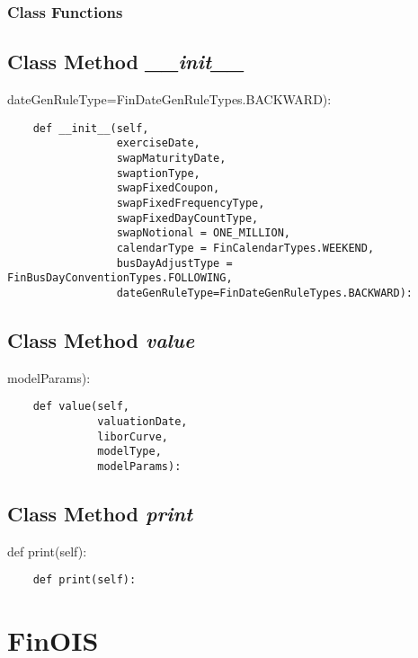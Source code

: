 \documentclass[twoside,11pt]{book}
\begin{document}
\subsubsection{Class Functions}

\subsection{Class Method {\it \_\_init\_\_}}
dateGenRuleType=FinDateGenRuleTypes.BACKWARD):

\begin{lstlisting}
    def __init__(self, 
                 exerciseDate,
                 swapMaturityDate,
                 swaptionType,
                 swapFixedCoupon,
                 swapFixedFrequencyType,
                 swapFixedDayCountType,
                 swapNotional = ONE_MILLION, 
                 calendarType = FinCalendarTypes.WEEKEND,
                 busDayAdjustType = FinBusDayConventionTypes.FOLLOWING,
                 dateGenRuleType=FinDateGenRuleTypes.BACKWARD):
\end{lstlisting}

\subsection{Class Method {\it value}}
modelParams):

\begin{lstlisting}
    def value(self, 
              valuationDate,
              liborCurve, 
              modelType, 
              modelParams):
\end{lstlisting}

\subsection{Class Method {\it print}}
def print(self):

\begin{lstlisting}
    def print(self):
\end{lstlisting}

\newpage
\section{FinOIS}
\end{document}
